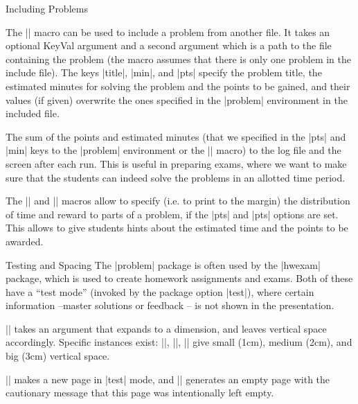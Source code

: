 \begin{sfragment}{Including Problems}
\begin{function}{}
  The || macro can be used to include a problem from another file. It takes
  an optional KeyVal argument and a second argument which is a path to the file containing
  the problem (the macro assumes that there is only one problem in the include file). The
  keys |title|, |min|, and |pts| specify the problem title, the estimated minutes for
  solving the problem and the points to be gained, and their values (if given) overwrite
  the ones specified in the |problem| environment in the included file.
\end{function}

The sum of the points and estimated minutes (that we specified in the |pts| and |min| keys
to the |problem| environment or the || macro) to the log file and the
screen after each run. This is useful in preparing exams, where we want to make sure that
the students can indeed solve the problems in an allotted time period.

The |\min| and |\pts| macros allow to specify (i.e. to print to the margin) the
distribution of time and reward to parts of a problem, if the |pts| and |pts| options are
set. This allows to give students hints about the estimated time and the points to be
awarded.
\end{sfragment}

\begin{sfragment}{Testing and Spacing}
The |problem| package is often used by the |hwexam| package, which is used to create
homework assignments and exams. Both of these have a ``test mode'' (invoked by the
package option |test|), where certain information --master solutions or feedback -- is
not shown in the presentation.

\DescribeMacro{\testspace}|\testspace| takes an argument that expands to a dimension, and
leaves vertical space accordingly. Specific instances exist:
\DescribeMacro{\testsmallspace}|\testsmallspace|,
\DescribeMacro{\testsmallspace}|\testsmallspace|,
\DescribeMacro{\testsmallspace}|\testsmallspace| give small (1cm), medium (2cm), and big (3cm)
vertical space.

\DescribeMacro{\testnewpage}|\testnewpage| makes a new page in |test| mode, and
\DescribeMacro{\testemptypage}|\testemptypage| generates an empty page with the cautionary
message that this page was intentionally left empty.
\end{sfragment}


